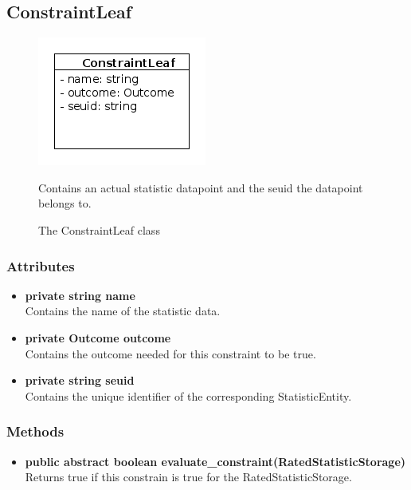 \subsection{ConstraintLeaf}
\begin{figure}[htbp]
	\begin{minipage}[t]{8cm}
		\vspace{0pt}
		\centering
		\includegraphics[scale=0.6]{./diagram_pictures/reactor/ConstraintLeaf.png}
		\caption{The ConstraintLeaf class}
	\end{minipage}
	\hfill
	\begin{minipage}[t]{8cm}
		\vspace{10pt}
			Contains an actual statistic datapoint and the seuid the datapoint belongs to.
	\end{minipage}
\end{figure}  

\subsubsection{Attributes}
\begin{itemize}
	\item \textbf{ private string name }\\
	Contains the name of the statistic data.
	\item \textbf{ private Outcome outcome }\\
	Contains the outcome needed for this constraint to be true.
	\item \textbf{ private string seuid }\\
	Contains the unique identifier of the corresponding StatisticEntity.
\end{itemize}
\subsubsection{Methods}
\begin{itemize}
	\item \textbf{ public abstract boolean evaluate\_constraint(RatedStatisticStorage) }\\
	Returns true if this constrain is true for the RatedStatisticStorage.
\end{itemize}


